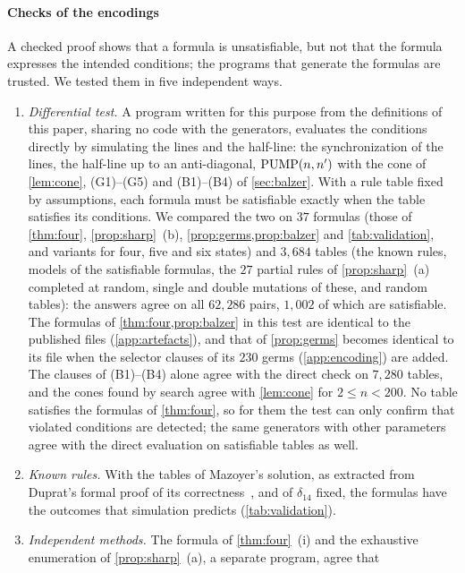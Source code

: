 \paragraph{Checks of the encodings}
A checked proof shows that a formula is unsatisfiable, but not that the formula
expresses the intended conditions; the programs that generate the formulas are
trusted. We tested them in five independent ways.
\begin{enumerate}[(1)]
\item \emph{Differential test.} A program written for this purpose from the
definitions of this paper, sharing no code with the generators, evaluates the
conditions directly by simulating the lines and the half-line: the
synchronization of the lines, the half-line up to an anti-diagonal,
$\mathrm{PUMP}(n,n')$ with the cone of \cref{lem:cone}, (G1)--(G5) and (B1)--(B4) of
\cref{sec:balzer}. With a rule table fixed by assumptions, each formula must be
satisfiable exactly when the table satisfies its conditions. We compared the two
on $37$ formulas (those of \cref{thm:four}, \cref{prop:sharp}~(b),
\cref{prop:germs,prop:balzer} and \cref{tab:validation}, and variants for four,
five and six states) and $3{,}684$ tables (the known rules, models of the
satisfiable formulas, the $27$ partial rules of \cref{prop:sharp}~(a) completed
at random, single and double mutations of these, and random tables): the
answers agree on all $62{,}286$ pairs, $1{,}002$ of which are satisfiable. The
formulas of \cref{thm:four,prop:balzer} in this test are identical to the
published files (\cref{app:artefacts}), and that of \cref{prop:germs} becomes
identical to its file when the selector clauses of its $230$ germs
(\cref{app:encoding}) are added. The
clauses of (B1)--(B4) alone agree with the direct check on $7{,}280$ tables, and
the cones found by search agree with \cref{lem:cone} for $2\le n<200$. No table
satisfies the formulas of \cref{thm:four}, so for them the test can only confirm
that violated conditions are detected; the same generators with other
parameters agree with the direct evaluation on satisfiable tables as well.
\item \emph{Known rules.} With the tables of Mazoyer's solution, as extracted
from Duprat's formal proof of its correctness~\cite{Duprat97}, and of
$\delta_{14}$ fixed, the formulas have the outcomes that simulation predicts
(\cref{tab:validation}).
\item \emph{Independent methods.} The formula of \cref{thm:four}~(i) and the
exhaustive enumeration of \cref{prop:sharp}~(a), a separate program, agree that

\end{enumerate}
